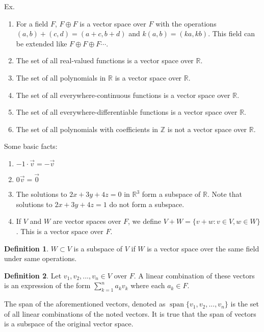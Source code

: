\documentclass{article}
\theoremstyle{definition}
\newtheorem{definition}{Definition}
\theoremstyle{plain}
\theoremstyle{corollary}
\theoremstyle{lemma}
\DeclareMathOperator{\vspan}{span}
\begin{document}
Ex. 
\begin{enumerate}
    \item For a field $F$, $F\oplus F$ is a vector space over $F$ with the operations $(a,b)+(c,d)=(a+c,b+d)$ and $k(a,b)=(ka,kb)$. This field can be extended like $F\oplus F\oplus F\cdots$.
    \item The set of all real-valued functions is a vector space over $\mathbb{R}$.
    \item The set of all polynomials in $\mathbb{R}$ is a vector space over $\mathbb{R}$.
    \item The set of all everywhere-continuous functions is a vector space over $\mathbb{R}$.
    \item The set of all everywhere-differentiable functions is a vector space over $\mathbb{R}$.
    \item The set of all polynomials with coefficients in $\mathbb{Z}$ is not a vector space over $\mathbb{R}$.
\end{enumerate}

Some basic facts:
\begin{enumerate}
    \item $-1\cdot\vec v=-\vec v$
    \item $0\vec v=\vec0$
    \item The solutions to $2x+3y+4z=0$ in $\mathbb{R}^3$ form a subspace of $\mathbb{R}$. Note that solutions to $2x+3y+4z=1$ do not form a subspace.
    \item If $V$ and $W$ are vector spaces over $F$, we define $V+W=\{v+w:v\in V,w\in W\}$. This is a vector space over $F$.
\end{enumerate}

\begin{definition}
    $W\subset V$ is a subspace of $V$ if $W$ is a vector space over the same field under same operations.
\end{definition}

\begin{definition}
    Let $v_1,v_2,...,v_n\in V$ over $F$. A linear combination of these vectors is an expression of the form $\sum_{k=1}^n a_kv_k$ where each $a_k\in F$.

    The span of the aforementioned vectors, denoted as $\vspan\{v_1,v_2,...,v_n\}$ is the set of all linear combinations of the noted vectors. It is true that the span of vectors is a subspace of the original vector space.
\end{definition}
\end{document}
